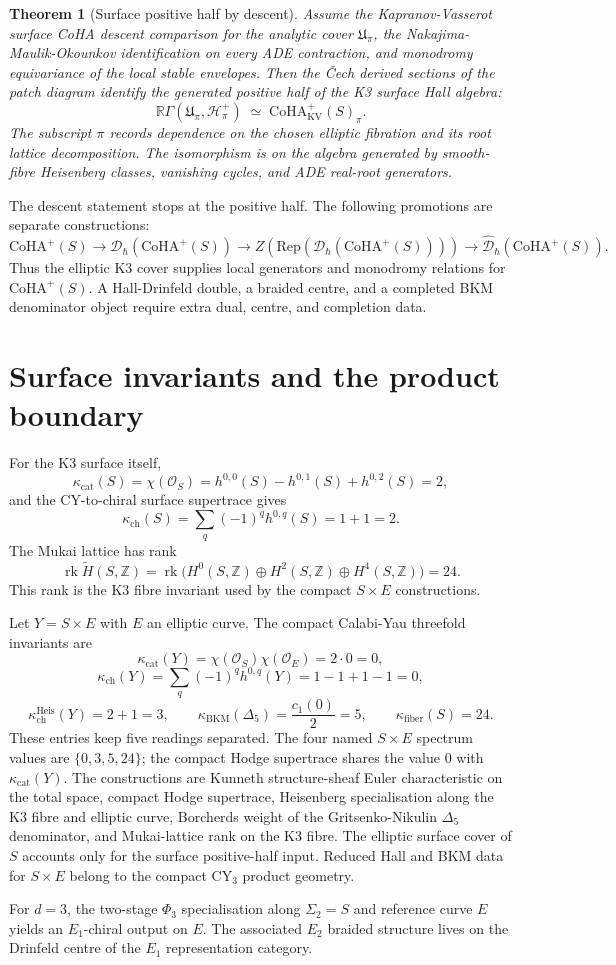 \documentclass[11pt]{article}
\theoremstyle{plain}
\newtheorem{theorem}{Theorem}[section]
\theoremstyle{definition}
\theoremstyle{remark}
\providecommand{\CoHA}{\mathrm{CoHA}}
\providecommand{\cO}{\mathcal{O}}
\providecommand{\ZZ}{\mathbb{Z}}
\providecommand{\kch}{\kappa_{\mathrm{ch}}}
\providecommand{\kcat}{\kappa_{\mathrm{cat}}}
\providecommand{\kBKM}{\kappa_{\mathrm{BKM}}}
\providecommand{\kfiber}{\kappa_{\mathrm{fiber}}}
\providecommand{\Rep}{\mathrm{Rep}}
\begin{document}
\begin{theorem}[Surface positive half by descent]
\label{thm:k3-surface-positive-half-descent}
Assume the Kapranov-Vasserot surface CoHA descent comparison for the
analytic cover $\mathfrak U_\pi$, the Nakajima-Maulik-Okounkov
identification on every ADE contraction, and monodromy equivariance
of the local stable envelopes. Then the \v{C}ech derived sections of
the patch diagram identify the generated positive half of the K3
surface Hall algebra:
\[
 \mathbb R\Gamma(\mathfrak U_\pi,\mathcal H^+_\pi)
 \;\simeq\;
 \CoHA^+_{\mathrm{KV}}(S)_{\pi}.
\]
The subscript $\pi$ records dependence on the chosen elliptic
fibration and its root lattice decomposition. The isomorphism is on
the algebra generated by smooth-fibre Heisenberg classes, vanishing
cycles, and ADE real-root generators.
\end{theorem}

The descent statement stops at the positive half. The following
promotions are separate constructions:
\[
 \CoHA^+(S)
 \longrightarrow
 \mathcal D_\hbar(\CoHA^+(S))
 \longrightarrow
 Z(\Rep(\mathcal D_\hbar(\CoHA^+(S))))
 \longrightarrow
 \widehat{\mathcal D}_\hbar(\CoHA^+(S)).
\]
Thus the elliptic K3 cover supplies local generators and monodromy
relations for $\CoHA^+(S)$. A Hall-Drinfeld double, a braided centre,
and a completed BKM denominator object require extra dual, centre,
and completion data.

\section{Surface invariants and the product boundary}

For the K3 surface itself,
\[
 \kcat(S)=\chi(\cO_S)=h^{0,0}(S)-h^{0,1}(S)+h^{0,2}(S)=2,
\]
and the CY-to-chiral surface supertrace gives
\[
 \kch(S)=\sum_q(-1)^q h^{0,q}(S)=1+1=2.
\]
The Mukai lattice has rank
\[
 \operatorname{rk}\widetilde H(S,\ZZ)
 =\operatorname{rk}\bigl(H^0(S,\ZZ)\oplus H^2(S,\ZZ)\oplus H^4(S,\ZZ)\bigr)
 =24.
\]
This rank is the K3 fibre invariant used by the compact
$S\times E$ constructions.

Let $Y=S\times E$ with $E$ an elliptic curve. The compact
Calabi-Yau threefold invariants are
\[
 \kcat(Y)=\chi(\cO_S)\chi(\cO_E)=2\cdot0=0,
\]
\[
 \kch(Y)=\sum_q(-1)^q h^{0,q}(Y)
 =1-1+1-1=0,
\]
\[
 \kappa_{\mathrm{ch}}^{\mathrm{Heis}}(Y)=2+1=3,\qquad
 \kBKM(\Delta_5)=\frac{c_1(0)}2=5,\qquad
 \kfiber(S)=24.
\]
These entries keep five readings separated. The four named
$S\times E$ spectrum values are $\{0,3,5,24\}$; the compact Hodge
supertrace shares the value $0$ with $\kcat(Y)$. The constructions are
Kunneth structure-sheaf Euler characteristic on the total space,
compact Hodge supertrace, Heisenberg specialisation along the K3 fibre
and elliptic curve, Borcherds weight of the Gritsenko-Nikulin
$\Delta_5$ denominator, and Mukai-lattice rank on the K3 fibre. The
elliptic surface cover of $S$ accounts only for the surface
positive-half input. Reduced Hall and BKM data for $S\times E$ belong
to the compact CY$_3$ product geometry.

For $d=3$, the two-stage $\Phi_3$ specialisation along
$\Sigma_2=S$ and reference curve $E$ yields an $E_1$-chiral output on
$E$. The associated $E_2$ braided structure lives on the Drinfeld
centre of the $E_1$ representation category.
\end{document}
